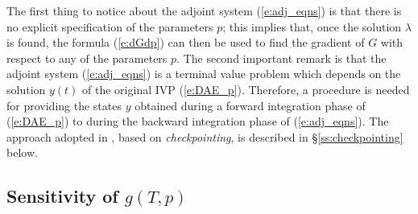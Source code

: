 The first thing to notice about the adjoint system (\ref{e:adj_eqns}) is that there
is no explicit specification of the parameters $p$; this implies that, once the
solution $\lambda$ is found, the formula (\ref{e:dGdp}) can then be used to find
the gradient of $G$ with respect to any of the parameters $p$.
The second important remark is that the adjoint system (\ref{e:adj_eqns}) is a
terminal value problem which depends on the solution $y(t)$ of the original IVP (\ref{e:DAE_p}).
Therefore, a procedure is needed for providing the states $y$ obtained during a forward
integration phase of (\ref{e:DAE_p}) to {\idas} during the backward integration phase of
(\ref{e:adj_eqns}).  The approach adopted in {\idas}, based on {\em checkpointing},
is described in \S\ref{ss:checkpointing} below.

\subsection{Sensitivity of $g(T,p)$}

